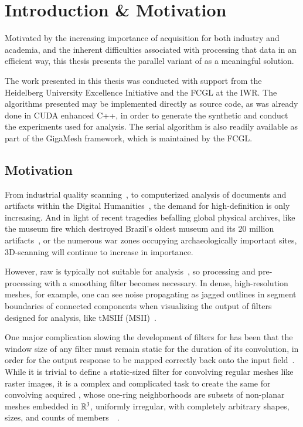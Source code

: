 \chapter{Introduction \& Motivation}
\label{ch1}
Motivated by the increasing importance of \tdd{} acquisition for both industry and academia, and the inherent difficulties associated with processing that data in an efficient way, this thesis presents the parallel variant of  as a meaningful solution.

The work presented in this thesis was conducted with support from the Heidelberg University Excellence Initiative and the \gls{FCGL} at the \gls{IWR}. The algorithms presented may be implemented directly as source code, as was already done in CUDA enhanced C++, in order to generate the synthetic \tdd{} and conduct the experiments used for analysis. The serial algorithm is also readily available as part of the GigaMesh framework, which is maintained by the \gls{FCGL}.

%
%
%
%
%
%
\section{Motivation}
From industrial quality scanning~\cite{ILATO14}, to computerized analysis of documents and artifacts within the Digital Humanities~\cite{Bogacz15}, the demand for high-definition \tdd{} is only increasing. And in light of recent tragedies befalling global physical archives, like the museum fire which destroyed Brazil's oldest museum and its 20 million artifacts~\cite{Andreoni18}, or the numerous war zones occupying archaeologically important sites, 3D-scanning will continue to increase in importance.

However, raw \tdd{} is typically not suitable for analysis~\cite[p.~25-32]{Mara12}, so processing and pre-processing with a smoothing filter becomes necessary. In dense, high-resolution meshes, for example, one can see noise propagating as jagged outlines in segment boundaries of connected components when visualizing the output of filters designed for analysis, like \acrlong{tMSIIf} (MSII)~\cite[s.~3.2]{Mara17}.

One major complication slowing the development of filters for \tdd{} has been that the window size of any filter must remain static for the duration of its convolution, in order for the output response to be mapped correctly back onto the input field~\cite[p.~106-112]{Jaehne97}. While it is trivial to define a static-sized filter for convolving regular meshes like raster images, it is a complex and complicated task to create the same for convolving acquired \tdd{}, whose one-ring neighborhoods are subsets of non-planar meshes embedded in $\mathbb{R}^{3}$, uniformly irregular, with completely arbitrary shapes, sizes, and counts of members~\cite[p.~29]{Mara12}~\cite[s.~3.2]{Mara17}.

